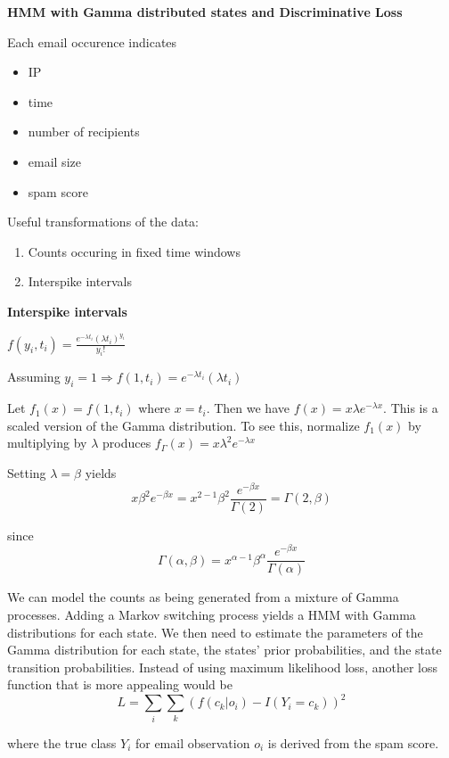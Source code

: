 \documentclass{article}
\begin{document}
  
 \textbf{HMM with Gamma distributed states and Discriminative Loss}
  
  

  
  Each email occurence indicates
  \begin{itemize}
  \item IP
  \item time
  \item number of recipients
  \item email size
  \item spam score
  \end{itemize}

  Useful transformations of the data:
  \begin{enumerate}
  \item Counts occuring in fixed time windows
  \item Interspike intervals
  \end{enumerate}

  \textbf{Interspike intervals}

  $f(y_i, t_i) = \frac{e^{-\lambda t_i} (\lambda t_i)^{y_i}}{y_i!}$

  Assuming $y_i = 1 \Rightarrow f(1, t_i) = e^{-\lambda t_i} (\lambda t_i)$

  Let $f_1(x) = f(1, t_i)$ where $x = t_i$. Then we have $f(x) = x \lambda e^{-\lambda x}$. This is a scaled version of the Gamma distribution. To see this, normalize $f_1(x)$ by multiplying by $\lambda$ produces $f_\Gamma(x) = x \lambda^2 e^{-\lambda x}$


  Setting $\lambda = \beta$ yields
  \[
  x \beta^2 e^{-\beta x} = x^{2-1} \beta^2 \frac{e^{-\beta x}}{\Gamma(2)} = \Gamma(2, \beta)
  \]

since 
  \[
  \Gamma(\alpha, \beta) = x^{\alpha-1} \beta^\alpha \frac{e^{-\beta x}}{\Gamma(\alpha)}
  \]

  We can model the counts as being generated from a mixture of Gamma processes. Adding a Markov switching process yields a HMM with Gamma distributions for each state. We then need to estimate the parameters of the Gamma distribution for each state, the states' prior probabilities, and the state transition probabilities. Instead of using maximum likelihood loss, another loss function that is more appealing would be
\[
L = \sum_i \sum_k (f(c_k | o_i) - I(Y_i = c_k))^2
\]

where the true class $Y_i$ for email observation $o_i$ is derived from the spam score.




  
  
\end{document}
